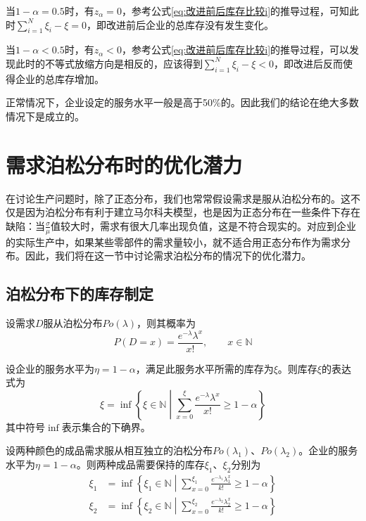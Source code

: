 当$1-\alpha=0.5$时，有$z_\alpha=0$，参考公式\ref{eq:改进前后库存比较i}的推导过程，可知此时$\sum_{i=1}^N\xi_i - \xi = 0$，即改进前后企业的总库存没有发生变化。

当$1-\alpha<0.5$时，有$z_\alpha<0$，参考公式\ref{eq:改进前后库存比较i}的推导过程，可以发现此时的不等式放缩方向是相反的，应该得到$\sum_{i=1}^N\xi_i - \xi < 0$，即改进后反而使得企业的总库存增加。

正常情况下，企业设定的服务水平一般是高于50\%的。因此我们的结论在绝大多数情况下是成立的。





\section{需求泊松分布时的优化潜力}

在讨论生产问题时，除了正态分布，我们也常常假设需求是服从泊松分布的。这不仅是因为泊松分布有利于建立马尔科夫模型，也是因为正态分布在一些条件下存在缺陷：当$\frac{\sigma}{\mu}$值较大时，需求有很大几率出现负值，这是不符合现实的。对应到企业的实际生产中，如果某些零部件的需求量较小，就不适合用正态分布作为需求分布。因此，我们将在这一节中讨论需求泊松分布的情况下的优化潜力。




\subsection{泊松分布下的库存制定}

设需求$D$服从泊松分布$Po(\lambda)$，则其概率为
\[
P(D=x) = \frac{e^{-\lambda}\lambda^x}{x!},\qquad x\in\mathbb{N}
\]

设企业的服务水平为$\eta=1-\alpha$，满足此服务水平所需的库存为$\xi$。则库存$\xi$的表达式为
\begin{equation}
\xi = \inf\left\{\xi\in\mathbb{N}\middle|\sum_{x=0}^{\xi}\frac{e^{-\lambda}\lambda^x}{x!}\geq 1-\alpha\right\}
\end{equation}
其中符号$\inf$表示集合的下确界。

设两种颜色的成品需求服从相互独立的泊松分布$Po(\lambda_1)$、$Po(\lambda_2)$。企业的服务水平为$\eta=1-\alpha$。则两种成品需要保持的库存$\xi_1$、$\xi_2$分别为
\begin{align}
\xi_1 &= \inf\left\{\xi_1\in\mathbb{N}\middle|\sum_{x=0}^{\xi_1}\frac{e^{-\lambda_1}\lambda_1^x}{k!}\geq 1-\alpha\right\} \label{eq:成品库存_泊松1}\\
\xi_2 &= \inf\left\{\xi_2\in\mathbb{N}\middle|\sum_{x=0}^{\xi_2}\frac{e^{-\lambda_2}\lambda_2^x}{k!}\geq 1-\alpha\right\} \label{eq:成品库存_泊松2}
\end{align}


